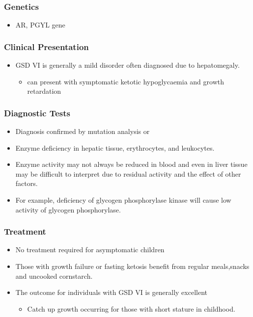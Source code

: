 \documentclass{scrartcl}
\begin{document}
\subsubsection{Genetics}
\label{sec:org92ec2d8}
\begin{itemize}
\item AR, PGYL gene
\end{itemize}

\subsubsection{Clinical Presentation}
\label{sec:orgc0f604a}
\begin{itemize}
\item GSD VI is generally a mild disorder often diagnosed due to hepatomegaly.
\begin{itemize}
\item can present with symptomatic ketotic hypoglycaemia and growth retardation
\end{itemize}
\end{itemize}
\subsubsection{Diagnostic Tests}
\label{sec:org171b604}
\begin{itemize}
\item Diagnosis confirmed by mutation analysis or
\item Enzyme deficiency in hepatic tissue, erythrocytes, and leukocytes.
\item Enzyme activity may not always be reduced in blood and even in liver
tissue may be difficult to interpret due to residual activity and
the effect of other factors.
\item For example, deficiency of glycogen phosphorylase kinase will cause
low activity of glycogen phosphorylase.
\end{itemize}
\subsubsection{Treatment}
\label{sec:org7e1af41}
\begin{itemize}
\item No treatment required for asymptomatic children
\item Those with growth failure or fasting ketosis benefit from regular
meals,snacks and uncooked cornstarch.
\item The outcome for individuals with GSD VI is generally excellent
\begin{itemize}
\item Catch up growth occurring for those with short stature in childhood.
\end{itemize}
\end{itemize}
\end{document}
